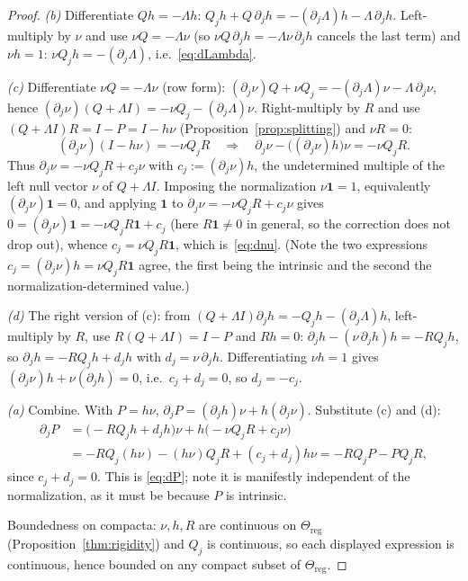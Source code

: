 \documentclass[11pt,reqno]{amsart}
\theoremstyle{plain}
\theoremstyle{definition}
\theoremstyle{remark}
\newcommand{\Reg}{\Theta_{\mathrm{reg}}}
\newcommand{\one}{\mathbf{1}}
\begin{document}
\begin{proof}
\emph{(b)} Differentiate $Qh=-\Lambda h$:
$Q_jh+Q\,\partial_jh=-(\partial_j\Lambda)h-\Lambda\,\partial_jh$. Left-multiply by
$\nu$ and use $\nu Q=-\Lambda\nu$ (so $\nu Q\,\partial_jh=-\Lambda\nu\,\partial_jh$
cancels the last term) and $\nu h=1$:
$\nu Q_jh=-(\partial_j\Lambda)$, i.e.\ \eqref{eq:dLambda}.

\emph{(c)} Differentiate $\nu Q=-\Lambda\nu$ (row form):
$(\partial_j\nu)Q+\nu Q_j=-(\partial_j\Lambda)\nu-\Lambda\,\partial_j\nu$, hence
$(\partial_j\nu)(Q+\Lambda I)=-\nu Q_j-(\partial_j\Lambda)\nu$. Right-multiply by
$R$ and use $(Q+\Lambda I)R=I-P=I-h\nu$ (Proposition~\ref{prop:splitting}) and
$\nu R=0$:
\[
(\partial_j\nu)(I-h\nu)=-\nu Q_jR
\quad\Longrightarrow\quad
\partial_j\nu-\bigl((\partial_j\nu)h\bigr)\nu=-\nu Q_jR .
\]
Thus $\partial_j\nu=-\nu Q_jR+c_j\nu$ with $c_j:=(\partial_j\nu)h$, the undetermined
multiple of the left null vector $\nu$ of $Q+\Lambda I$. Imposing the normalization
$\nu\one = 1$, equivalently $(\partial_j\nu)\one = 0$, and applying $\one$ to
$\partial_j\nu = -\nu Q_j R + c_j\nu$ gives
$0 = (\partial_j\nu)\one = -\nu Q_j R\one + c_j$ (here $R\one \neq 0$ in general, so
the correction does not drop out), whence $c_j = \nu Q_j R\one$, which
is~\eqref{eq:dnu}. (Note the two expressions $c_j=(\partial_j\nu)h=\nu Q_jR\one$
agree, the first being the intrinsic and the second the normalization-determined
value.)

\emph{(d)} The right version of (c): from
$(Q+\Lambda I)\partial_jh=-Q_jh-(\partial_j\Lambda)h$, left-multiply by $R$, use
$R(Q+\Lambda I)=I-P$ and $Rh=0$:
$\partial_jh-(\nu\,\partial_jh)h=-RQ_jh$, so $\partial_jh=-RQ_jh+d_jh$ with
$d_j=\nu\,\partial_jh$. Differentiating $\nu h=1$ gives
$(\partial_j\nu)h+\nu(\partial_jh)=0$, i.e.\ $c_j+d_j=0$, so $d_j=-c_j$.

\emph{(a)} Combine. With $P=h\nu$, $\partial_jP=(\partial_jh)\nu+h(\partial_j\nu)$.
Substitute (c) and (d):
\begin{align*}
\partial_jP
&=\bigl(-RQ_jh+d_jh\bigr)\nu+h\bigl(-\nu Q_jR+c_j\nu\bigr)\\
&=-RQ_j(h\nu)-(h\nu)Q_jR+(c_j+d_j)h\nu
=-RQ_jP-PQ_jR,
\end{align*}
since $c_j+d_j=0$. This is \eqref{eq:dP}; note it is manifestly independent of the
normalization, as it must be because $P$ is intrinsic.

Boundedness on compacta: $\nu,h,R$ are continuous on $\Reg$
(Proposition~\ref{thm:rigidity}) and $Q_j$ is continuous, so each displayed expression
is continuous, hence bounded on any compact subset of $\Reg$.
\end{proof}
\end{document}
